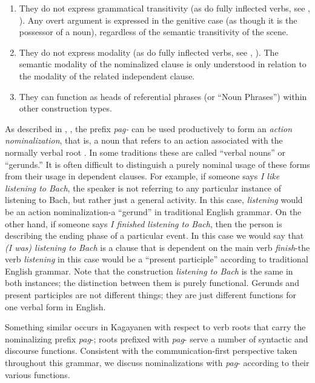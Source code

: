 \begin{enumerate}
    \item  They do not express grammatical transitivity (as do fully inflected verbs, see , ). Any overt argument is expressed in the genitive case (as though it is the possessor of a noun), regardless of the semantic transitivity of the scene.
    \item They do not express modality (as do fully inflected verbs, see , ). The semantic modality of the nominalized clause is only understood in relation to the modality of the related independent clause.
    \item They can function as heads of referential phrases (or “Noun Phrases”) within other construction types.
\end{enumerate}

As described in , , the prefix \textit{pag-} can be used productively to form an \textit{action nominalization}, that is, a noun that refers to an action associated with the normally verbal root \citep[224]{payne1997}. In some traditions these are called “verbal nouns” or “gerunds.” It is often difficult to distinguish a purely nominal usage of these forms from their usage in dependent clauses. For example, if someone says \textit{I like listening to Bach}, the speaker is not referring to any particular instance of listening to Bach, but rather just a general activity. In this case, \textit{listening} would be an action nominalization-a “gerund” in traditional English grammar. On the other hand, if someone says \textit{I finished listening to Bach}, then the person is describing the ending phase of a particular event. In this case we would say that \textit{(I was) listening to Bach} is a clause that is dependent on the main verb \textit{finish}-the verb \textit{listening} in this case would be a “present participle” according to traditional English grammar. Note that the construction \textit{listening to Bach} is the same in both instances; the distinction between them is purely functional. Gerunds and present participles are not different things; they are just different functions for one verbal form in English.

Something similar occurs in Kagayanen with respect to verb roots that carry the nominalizing prefix \textit{pag}{}-; roots prefixed with \textit{pag}- serve a number of syntactic and discourse functions. Consistent with the communication-first perspective taken throughout this grammar, we discuss nominalizations with \textit{pag}- according to their various functions.

